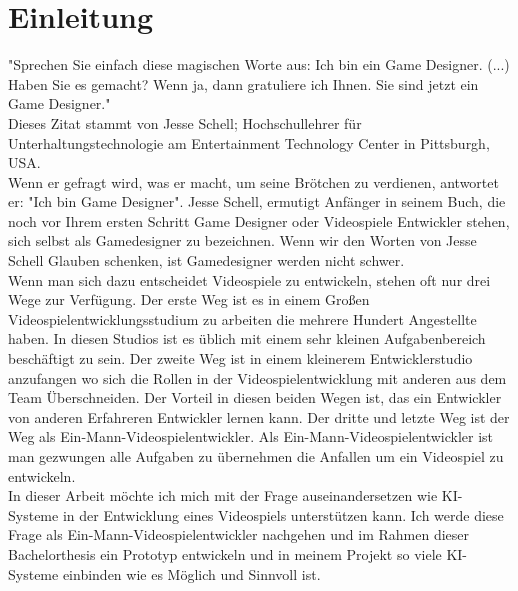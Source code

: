 \documentclass[10pt,a4paper,bibliography=totocnumbered,listof=totocnumbered]{scrartcl}
\begin{document}
\section{Einleitung}
"Sprechen Sie einfach diese magischen Worte aus: Ich bin ein Game Designer. (...) Haben Sie es gemacht? Wenn ja, dann gratuliere ich Ihnen. Sie sind jetzt ein Game Designer."\cite[S. 37]{schell2020kunst}
\\
Dieses Zitat stammt von Jesse Schell; Hochschullehrer für Unterhaltungstechnologie am Entertainment Technology Center in Pittsburgh, USA.
\\
Wenn er gefragt wird, was er macht, um seine Brötchen zu verdienen, antwortet er: "Ich bin Game Designer". Jesse Schell, ermutigt Anfänger in seinem Buch, die noch vor Ihrem ersten Schritt Game Designer oder Videospiele Entwickler stehen, sich selbst als Gamedesigner zu bezeichnen. Wenn wir den Worten von Jesse Schell Glauben schenken, ist Gamedesigner werden nicht schwer.
\\
Wenn man sich dazu entscheidet Videospiele zu entwickeln, stehen oft nur drei Wege zur Verfügung. Der erste Weg ist es in einem Großen Videospielentwicklungsstudium zu arbeiten die mehrere Hundert Angestellte haben. In diesen Studios ist es üblich mit einem sehr kleinen Aufgabenbereich beschäftigt zu sein. Der zweite Weg ist in einem kleinerem Entwicklerstudio anzufangen wo sich die Rollen in der Videospielentwicklung mit anderen aus dem Team Überschneiden. Der Vorteil in diesen beiden Wegen ist, das ein Entwickler von anderen Erfahreren Entwickler lernen kann. Der dritte und letzte Weg ist der Weg als Ein-Mann-Videospielentwickler. Als Ein-Mann-Videospielentwickler ist man gezwungen alle Aufgaben zu übernehmen die Anfallen um ein Videospiel zu entwickeln.
\\
In dieser Arbeit möchte ich mich mit der Frage auseinandersetzen wie KI-Systeme in der Entwicklung eines Videospiels unterstützen kann. Ich werde diese Frage als Ein-Mann-Videospielentwickler nachgehen und im Rahmen dieser Bachelorthesis ein Prototyp entwickeln und in meinem Projekt so viele KI-Systeme einbinden wie es Möglich und Sinnvoll ist.

 
\end{document}
